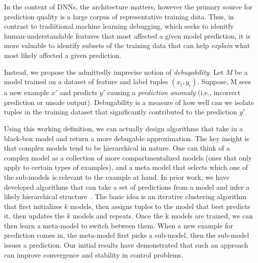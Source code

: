 In the context of DNNs, the architecture matters, however the primary source for prediction quality is a large corpus of representative training data.  
Thus, in contrast to tradiitional machine learning debugging, which seeks to idenitfy human-understandable features that most affected a given model prediction, it is more valuable to identify subsets of the training data that can help {\it explain} what most likely affected a given prediction.




Instead, we propose the admittedly imprecise notion of \emph{debugability}.
Let $M$ be a model trained on a dataset of feature and label tuples $(x_i,y_i)$.
Suppose, M sees a new example $x'$ and predicts $y'$ causing a \emph{prediction anomaly} (i.e., incorrect prediction or unsafe output).
Debugability is a measure of how well can we isolate tuples in the training dataset that significantly contributed to the prediction $y'$.

Using this working definition, we can actually design algorithms that take in a black-box model and return a more debugable approximation.
The key insight is that complex models tend to be hierarchical in nature.
One can think of a complex model as a collection of more compartmentalized models (ones that only apply to certain types of examples), and a meta model that selects which one of the sub-models is relevant to the example at hand.
In prior work, we have developed algorithms that can take a set of predictions from a model and infer a likely hierarchical structure~\cite{DBLP:journals/corr/KrishnanGLMPG16, Krishnan17}.
The basic idea is an iterative clustering algorithm that first initializes $k$ models, then assigns tuples to the model that best predicts it, then updates the $k$ models and repeats.
Once the k models are trained, we can then learn a meta-model to switch between them.
When a new example for prediction comes in, the meta-model first picks a sub-model, then the sub-model issues a prediction.
Our initial results have demonstrated that such an approach can improve convergence and stability in control problems.

